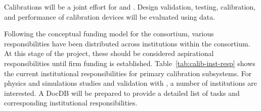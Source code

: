 


Calibrations %
will be a joint effort for \single and \dual. Design validation, testing, calibration, and performance of calibration devices will be evaluated using  data.

Following the conceptual funding model for the consortium, various responsibilities have been distributed across institutions within the consortium. At this stage of the project, these should be considered aspirational responsibilities until firm funding is established. Table~\ref{tab:calib-inst-resp} shows the current institutional responsibilities for primary calibration subsystems. 
For physics and simulations studies and validation with , a number of institutions are interested. A 
 DocDB will be prepared to provide a detailed list of tasks and corresponding institutional responsibilities.


\begin{comment}
\begin{dunetable}
[Institutional responsibility for calibrations]
{p{0.25\textwidth}p{0.65\textwidth}}
{tab:calib-inst-resp}
{Institutional responsibilities in the Calibration Consortium}   
System & Institutional Responsibility \\ \toprowrule
Laser System & Bern, Hawaii, LIP, Pitt, UTK \\ \colhline
Pulsed Neutron Source & BU, CSU, UC Davis, Iowa, LIP, MSU, SDSMT \\ \colhline
\end{dunetable}
\end{comment}

